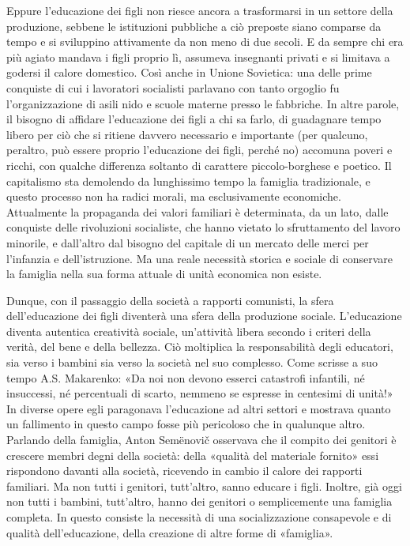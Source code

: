 \documentclass[../main]{subfiles}
\begin{document}
Eppure l'educazione dei figli non riesce ancora a trasformarsi in un settore della produzione, sebbene le istituzioni pubbliche a ciò preposte siano comparse da tempo e si sviluppino attivamente da non meno di due secoli. E da sempre chi era più agiato mandava i figli proprio lì, assumeva insegnanti privati e si limitava a godersi il calore domestico. Così anche in Unione Sovietica: una delle prime conquiste di cui i lavoratori socialisti parlavano con tanto orgoglio fu l'organizzazione di asili nido e scuole materne presso le fabbriche. In altre parole, il bisogno di affidare l'educazione dei figli a chi sa farlo, di guadagnare tempo libero per ciò che si ritiene davvero necessario e importante (per qualcuno, peraltro, può essere proprio l'educazione dei figli, perché no) accomuna poveri e ricchi, con qualche differenza soltanto di carattere piccolo-borghese e poetico. Il capitalismo sta demolendo da lunghissimo tempo la famiglia tradizionale, e questo processo non ha radici morali, ma esclusivamente economiche. Attualmente la propaganda dei valori familiari è determinata, da un lato, dalle conquiste delle rivoluzioni socialiste, che hanno vietato lo sfruttamento del lavoro minorile, e dall'altro dal bisogno del capitale di un mercato delle merci per l'infanzia e dell'istruzione. Ma una reale necessità storica e sociale di conservare la famiglia nella sua forma attuale di unità economica non esiste.

Dunque, con il passaggio della società a rapporti comunisti, la sfera dell'educazione dei figli diventerà una sfera della produzione sociale. L'educazione diventa autentica creatività sociale, un'attività libera secondo i criteri della verità, del bene e della bellezza. Ciò moltiplica la responsabilità degli educatori, sia verso i bambini sia verso la società nel suo complesso. Come scrisse a suo tempo A.S. Makarenko: «Da noi non devono esserci catastrofi infantili, né insuccessi, né percentuali di scarto, nemmeno se espresse in centesimi di unità!» In diverse opere egli paragonava l'educazione ad altri settori e mostrava quanto un fallimento in questo campo fosse più pericoloso che in qualunque altro. Parlando della famiglia, Anton Semënovič osservava che il compito dei genitori è crescere membri degni della società: della «qualità del materiale fornito» essi rispondono davanti alla società, ricevendo in cambio il calore dei rapporti familiari. Ma non tutti i genitori, tutt'altro, sanno educare i figli. Inoltre, già oggi non tutti i bambini, tutt'altro, hanno dei genitori o semplicemente una famiglia completa. In questo consiste la necessità di una socializzazione consapevole e di qualità dell'educazione, della creazione di altre forme di «famiglia».
\end{document}
